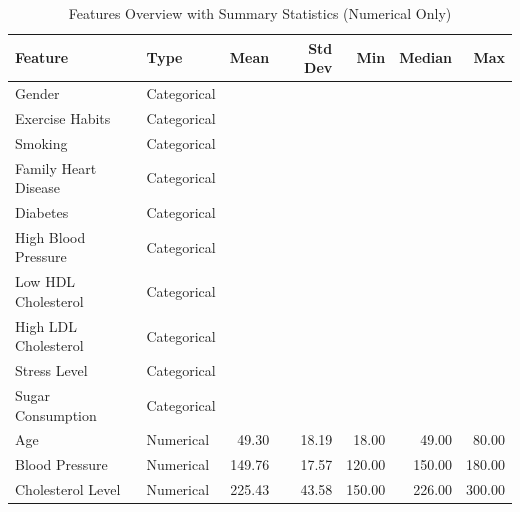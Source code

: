 \documentclass[11pt,a4paper]{article}
\begin{document}
\begin{table}[H]
    \centering
    \caption{Features Overview with Summary Statistics (Numerical Only)}
    \small
    \begin{tabular}{|l|l|r|r|r|r|r|}
        \hline
        \textbf{Feature}     & \textbf{Type} & \textbf{Mean} & \textbf{Std Dev} & \textbf{Min} & \textbf{Median} & \textbf{Max} \\
        \hline
        Gender               & Categorical   &               &                  &              &                 &              \\
        Exercise Habits      & Categorical   &               &                  &              &                 &              \\
        Smoking              & Categorical   &               &                  &              &                 &              \\
        Family Heart Disease & Categorical   &               &                  &              &                 &              \\
        Diabetes             & Categorical   &               &                  &              &                 &              \\
        High Blood Pressure  & Categorical   &               &                  &              &                 &              \\
        Low HDL Cholesterol  & Categorical   &               &                  &              &                 &              \\
        High LDL Cholesterol & Categorical   &               &                  &              &                 &              \\
        Stress Level         & Categorical   &               &                  &              &                 &              \\
        Sugar Consumption    & Categorical   &               &                  &              &                 &              \\
        Age                  & Numerical     & 49.30         & 18.19            & 18.00        & 49.00           & 80.00        \\
        Blood Pressure       & Numerical     & 149.76        & 17.57            & 120.00       & 150.00          & 180.00       \\
        Cholesterol Level    & Numerical     & 225.43        & 43.58            & 150.00       & 226.00          & 300.00       \\

\end{tabular}
\end{table}
\end{document}
